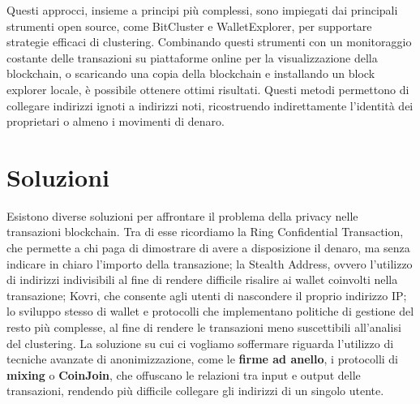 Questi approcci, insieme a principi più complessi, sono impiegati dai principali strumenti open source, come BitCluster e WalletExplorer, per supportare strategie efficaci di clustering. Combinando questi strumenti con un monitoraggio costante delle transazioni su piattaforme online per la visualizzazione della blockchain, o scaricando una copia della blockchain e installando un block explorer locale, è possibile ottenere ottimi risultati. Questi metodi permettono di collegare indirizzi ignoti a indirizzi noti, ricostruendo indirettamente l'identità dei proprietari o almeno i movimenti di denaro.

\section{Soluzioni}
Esistono diverse soluzioni per affrontare il problema della privacy nelle transazioni blockchain. Tra di esse ricordiamo la Ring Confidential Transaction, che permette a chi paga di dimostrare di avere a disposizione il denaro, ma senza indicare in chiaro l'importo della transazione; la Stealth Address, ovvero l'utilizzo di indirizzi indivisibili al fine di rendere difficile risalire ai wallet coinvolti nella transazione; Kovri, che consente agli utenti di nascondere il proprio indirizzo IP; lo sviluppo stesso di wallet e protocolli che implementano politiche di gestione del resto più complesse, al fine di rendere le transazioni meno suscettibili all'analisi del clustering. La soluzione su cui ci vogliamo soffermare riguarda l'utilizzo di tecniche avanzate di anonimizzazione, come le \textbf{firme ad anello}, i protocolli di \textbf{mixing} o \textbf{CoinJoin}, che offuscano le relazioni tra input e output delle transazioni, rendendo più difficile collegare gli indirizzi di un singolo utente.

